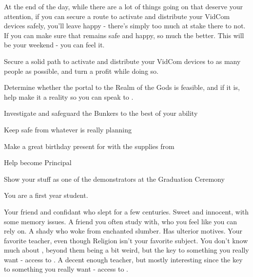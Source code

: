 \documentclass[char]{GL2020}
\begin{document}
At the end of the day, while there are a lot of things going on that deserve your attention, if you can secure a route to activate and distribute your VidCom devices safely, you’ll leave happy - there’s simply too much at stake there to not. If you can make sure that \cDisney{} remains safe and happy, so much the better. This will be your weekend - you can feel it.

\begin{itemz}[Goals]
	\item Secure a solid path to activate and distribute your VidCom devices to as many people as possible, and turn a profit while doing so.
	\item Determine whether the portal to the Realm of the Gods is feasible, and if it is, help make it a reality so you can speak to \cTechGod{}.
	\item Investigate and safeguard the Bunkers to the best of your ability
	\item Keep \cDisney{} safe from whatever \cWildCard{} is really planning
	\item Make a great birthday present for \cDisney{} with the supplies from \cBunker{}
	\item Help \cBeetle{} become Principal
	\item Show your stuff as one of the demonstrators at the Graduation Ceremony
\end{itemz}

\begin{itemz}[Notes]
	\item You are a first year student.
\end{itemz}

\begin{contacts}
	\contact{\cDisney{}} Your friend and confidant who slept for a few centuries. Sweet and innocent, with some memory issues.
	\contact{\cScholarship{}}A friend you often study with, who you feel like you can rely on.
	\contact{\cWildCard{}} A shady \cWildCard{\person} who woke \cDisney{} from \cDisney{\their} enchanted slumber. Has ulterior motives.
	\contact{\cBeetle{}} Your favorite teacher, even though Religion isn’t your favorite subject. 
	\contact{\cCurse{}} You don’t know much about \cCurse{\them}, beyond them being a bit weird, but \cCurse{\they} \cCurse{\have} the key to something you really 	want - access to \cTechGod{}.  
	\contact{\cFlowPriest{}} A decent enough teacher, but mostly interesting since \cFlowPriest{\they} \cFlowPriest{\have} the key to something you really want - access to \cTechGod{}. 
\end{contacts}
\end{document}
